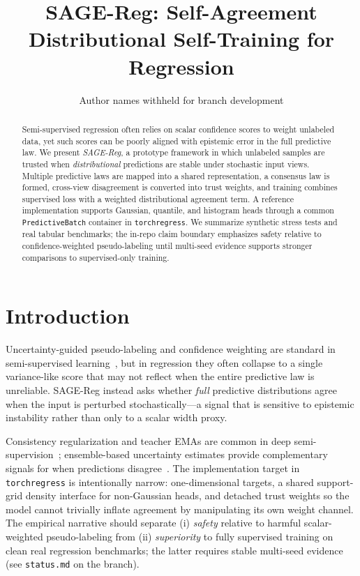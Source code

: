 \documentclass{article}
\title{SAGE-Reg: Self-Agreement Distributional Self-Training for Regression}
\author{%
  Author names withheld for branch development
}
\begin{document}
\maketitle

\begin{abstract}
Semi-supervised regression often relies on scalar confidence scores to weight
unlabeled data, yet such scores can be poorly aligned with epistemic error in
the full predictive law. We present \emph{SAGE-Reg}, a prototype framework in
which unlabeled samples are trusted when \emph{distributional} predictions are
stable under stochastic input views. Multiple predictive laws are mapped into a
shared representation, a consensus law is formed, cross-view disagreement is
converted into trust weights, and training combines supervised loss with a
weighted distributional agreement term. A reference implementation supports
Gaussian, quantile, and histogram heads through a common
\texttt{PredictiveBatch} container in \texttt{torchregress}. We summarize
synthetic stress tests and real tabular benchmarks; the in-repo claim boundary
emphasizes safety relative to confidence-weighted pseudo-labeling until
multi-seed evidence supports stronger comparisons to supervised-only training.
\end{abstract}

\section{Introduction}

Uncertainty-guided pseudo-labeling and confidence weighting are standard in
semi-supervised learning~\citep{chapelle2006semisupervised}, but in regression they often collapse to a single
variance-like score that may not reflect when the entire predictive law is
unreliable. SAGE-Reg instead asks whether \emph{full} predictive distributions
agree when the input is perturbed stochastically---a signal that is sensitive
to epistemic instability rather than only to a scalar width proxy.

Consistency regularization and teacher EMAs are common in deep
semi-supervision~\citep{tarvainen2017mean}; ensemble-based uncertainty estimates
provide complementary signals for when predictions disagree~\citep{lakshminarayanan2017deep}.
The implementation target in \texttt{torchregress} is intentionally narrow:
one-dimensional targets, a shared support-grid density interface for
non-Gaussian heads, and detached trust weights so the model cannot trivially
inflate agreement by manipulating its own weight channel. The empirical
narrative should separate (i) \emph{safety} relative to harmful scalar-weighted
pseudo-labeling from (ii) \emph{superiority} to fully supervised training on
clean real regression benchmarks; the latter requires stable multi-seed
evidence (see \texttt{status.md} on the branch).
\end{document}
